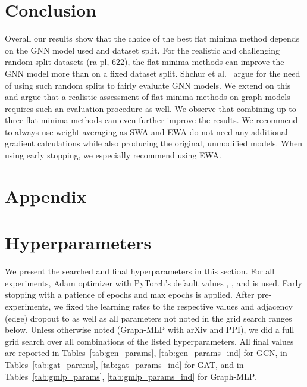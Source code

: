 \documentclass[runningheads]{llncs}
\newcommand{\GraphMLP}{Graph-MLP\xspace}
\begin{document}
\section{Conclusion}
\label{sec:conclusion}
Overall our results show that the choice of the best flat minima method depends on the GNN model used and dataset split.
For the realistic and challenging random split datasets (ra-pl, 622), the flat minima methods can improve the GNN model more than on a fixed dataset split.
Shchur et al.~\cite{Shchur18pitfalls} argue for the need of using such random splits to fairly evaluate GNN models.
We extend on this and argue that a realistic assessment of flat minima methods on graph models requires such an evaluation procedure as well.
We observe that combining up to three flat minima methods can even further improve the results.
We recommend to always use weight averaging as SWA and EWA do not need any additional gradient calculations while also producing the original, unmodified models.
When using early stopping, we especially recommend using EWA.





\clearpage


\section*{Appendix}
\appendix


\section{Hyperparameters}
\label{appx:hyper}
We present the searched and final hyperparameters in this section.
For all experiments, Adam optimizer with PyTorch's default values , , and  is used.
Early stopping with a patience of  epochs and  max epochs is applied.
After pre-experiments, we fixed the learning rates to the respective values and adjacency (edge) dropout to  as well as all parameters not noted in the grid search ranges below.
Unless otherwise noted (\GraphMLP with arXiv and PPI), we did a full grid search over all combinations of the listed hyperparameters.
All final values are reported in Tables~\ref{tab:gcn_params}, \ref{tab:gcn_params_ind} for GCN, in Tables~\ref{tab:gat_params}, \ref{tab:gat_params_ind} for GAT, and in Tables~\ref{tab:gmlp_params}, \ref{tab:gmlp_params_ind} for \GraphMLP.
\end{document}
